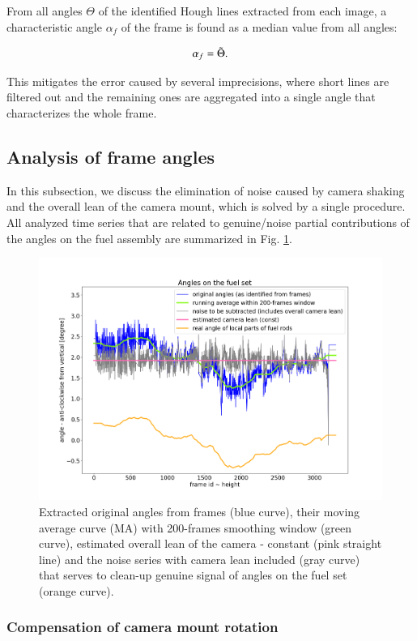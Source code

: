 \documentclass[preprint,12pt]{elsarticle}
\begin{document}
From all angles $\Theta$ of the identified Hough lines extracted from each image, a characteristic angle $\alpha_f$ of the frame is found as a median value from all angles:

\[ \alpha_f = \Tilde{\Theta} .\]

This mitigates the error caused by several imprecisions, where short lines are filtered out and the remaining ones are aggregated into a single angle that characterizes the whole frame.
 
\subsection{Analysis of frame angles}

In this subsection, we discuss the elimination of noise caused by camera shaking and the overall lean of the camera mount, which is solved by a single procedure. All analyzed time series that are related to genuine/noise partial contributions of the angles on the fuel assembly are summarized in Fig. \ref{fig:Angles}.

\begin{figure}
    \includegraphics[width=\textwidth]{Angles.png}
    \caption{Extracted original angles from frames (blue curve), their moving average curve (MA) with 200-frames smoothing window (green curve), estimated overall lean of the camera - constant (pink straight line) and the noise series with camera lean included (gray curve) that serves to clean-up genuine signal of angles on the fuel set (orange curve).}
\label{fig:Angles}
\end{figure}

\subsubsection{Compensation of camera mount rotation}
\end{document}
